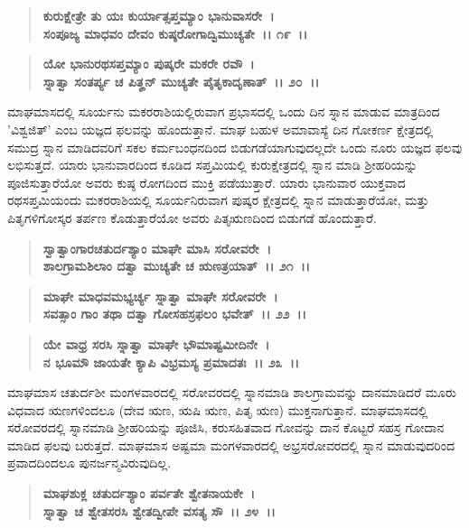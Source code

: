 \begin{verse}
\textbf{ಕುರುಕ್ಷೇತ್ರೇ ತು ಯಃ ಕುರ್ಯಾತ್ಸಪ್ತಮ್ಯಾಂ ಭಾನುವಾಸರೇ~।}\\\textbf{ಸಂಪೂಜ್ಯ ಮಾಧವಂ ದೇವಂ ಕುಷ್ಠರೋಗಾದ್ವಿಮುಚ್ಯತೇ~।। ೧೯~।।} 
\end{verse}

\begin{verse}
\textbf{ಯೋ ಭಾನುರಥಸಪ್ತಮ್ಯಾಂ ಪುಷ್ಕರೇ ಮಕರೇ ರವೌ~।}\\\textbf{ಸ್ನಾತ್ವಾ ಸಂತರ್ಪ್ಯ ಚ ಪಿತೄನ್ ಮುಚ್ಯತೇ ಪೈತೃಕಾದೃಣಾತ್~।। ೨೦~।।}
\end{verse}

ಮಾಘಮಾಸದಲ್ಲಿ ಸೂರ್ಯನು ಮಕರರಾಶಿಯಲ್ಲಿರುವಾಗ ಪ್ರಭಾಸದಲ್ಲಿ ಒಂದು ದಿನ ಸ್ನಾನ ಮಾಡುವ ಮಾತ್ರದಿಂದ 'ವಿಶ್ವಜಿತ್' ಎಂಬ ಯಜ್ಞದ ಫಲವನ್ನು ಹೊಂದುತ್ತಾನೆ. ಮಾಘ ಬಹುಳ ಅಮಾವಾಸ್ಯೆ ದಿನ ಗೋಕರ್ಣ ಕ್ಷೇತ್ರದಲ್ಲಿ ಸಮುದ್ರ ಸ್ನಾನ ಮಾಡಿದವರಿಗೆ ಸಕಲ ಕರ್ಮಬಂಧನದಿಂದ ಬಿಡುಗಡೆಯಾಗುವುದಲ್ಲದೇ ಒಂದು ನೂರು ಯಜ್ಞದ ಫಲವು ಲಭಿಸುತ್ತದೆ. ಯಾರು ಭಾನುವಾರದಿಂದ ಕೂಡಿದ ಸಪ್ತಮಿಯಲ್ಲಿ ಕುರುಕ್ಷೇತ್ರದಲ್ಲಿ ಸ್ನಾನ ಮಾಡಿ ಶ‍್ರೀಹರಿಯನ್ನು ಪೂಜಿಸುತ್ತಾರೆಯೋ ಅವರು ಕುಷ್ಠ ರೋಗದಿಂದ ಮುಕ್ತಿ ಪಡೆಯುತ್ತಾರೆ. ಯಾರು ಭಾನುವಾರ ಯುಕ್ತವಾದ ರಥಸಪ್ತಮಿಯಂದು ಮಕರರಾಶಿಯಲ್ಲಿ ಸೂರ್ಯನಿರುವಾಗ ಪುಷ್ಕರ ಕ್ಷೇತ್ರದಲ್ಲಿ ಸ್ನಾನ ಮಾಡುತ್ತಾರೆಯೋ, ಮತ್ತು ಪಿತೃಗಳಿಗೋಸ್ಕರ ತರ್ಪಣ ಕೊಡುತ್ತಾರೆಯೋ ಅವರು ಪಿತೃಋಣದಿಂದ ಬಿಡುಗಡೆ ಹೊಂದುತ್ತಾರೆ.

\begin{verse}
\textbf{ಸ್ವಾತ್ವಾಂಗಾರಚತುರ್ದಶ್ಯಾಂ ಮಾಘೇ ಮಾಸಿ ಸರೋವರೇ~।}\\\textbf{ಶಾಲಗ್ರಾಮಶಿಲಾಂ ದತ್ವಾ ಮುಚ್ಯತೇ ಚ ಋಣತ್ರಯಾತ್~।। ೨೧~।। }
\end{verse}

\begin{verse}
\textbf{ಮಾಘೇ ಮಾಧವಮಭ್ಯರ್ಚ್ಯ ಸ್ನಾತ್ವಾ ಮಾಘೇ ಸರೋವರೇ~।}\\\textbf{ಸವತ್ಸಾಂ ಗಾಂ ತಥಾ ದತ್ವಾ ಗೋಸಹಸ್ರಫಲಂ ಭವೇತ್~।। ೨೨~।।} 
\end{verse}

\begin{verse}
\textbf{ಯೇ ವಾಧ್ರ ಸರಸಿ ಸ್ನಾತ್ವಾ ಮಾಘೇ ಭೌಮಾಷ್ಟಮೀದಿನೇ~।}\\\textbf{ನ ಭೂಮೌ ಜಾಯತೇ ಕ್ಯಾಪಿ ವಿಭ್ರಮಸ್ಯ ಪ್ರಮಾದತಃ~।। ೨೩~।।}
\end{verse}

ಮಾಘಮಾಸ ಚತುರ್ದಶೀ ಮಂಗಳವಾರದಲ್ಲಿ ಸರೋವರದಲ್ಲಿ ಸ್ನಾನಮಾಡಿ ಶಾಲಗ್ರಾಮವನ್ನು ದಾನಮಾಡಿದರೆ ಮೂರು ವಿಧವಾದ ಋಣಗಳಿಂದಲೂ (ದೇವ ಋಣ, ಋಷಿ ಋಣ, ಪಿತೃ ಋಣ) ಮುಕ್ತನಾಗುತ್ತಾನೆ. ಮಾಘಮಾಸದಲ್ಲಿ ಸರೋವರದಲ್ಲಿ ಸ್ನಾನಮಾಡಿ ಶ‍್ರೀಹರಿಯನ್ನು ಪೂಜಿಸಿ, ಕರುಸಹಿತವಾದ ಗೋವನ್ನು ದಾನ ಕೊಟ್ಟರೆ ಸಹಸ್ರ ಗೋದಾನ ಮಾಡಿದ ಫಲವು ಬರುತ್ತದೆ. ಮಾಘಮಾಸ ಅಷ್ಟಮಾ ಮಂಗಳವಾರದಲ್ಲಿ ಅಭ್ರಸರೋವರದಲ್ಲಿ ಸ್ನಾನ ಮಾಡುವುದರಿಂದ ಪ್ರವಾದದಿಂದಲೂ ಪುನರ್ಜನ್ಮವಿರುವುದಿಲ್ಲ.

\begin{verse}
\textbf{ಮಾಘಶುಕ್ಲ ಚತುರ್ದಶ್ಯಾಂ ಪರ್ವತೇ ಶ್ವೇತನಾಯಕೇ~।}\\\textbf{ಸ್ನಾತ್ವಾ ಚ ಶ್ವೇತಸರಸಿ ಶ್ವೇತದ್ವೀಪೇ ವಸತ್ಯ ಸೌ~।। ೨೪~।। }
\end{verse}

